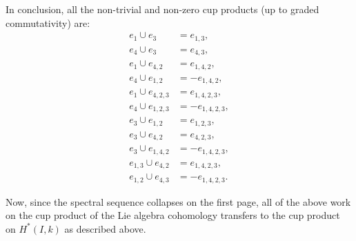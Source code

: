 In conclusion, all the non-trivial and non-zero cup products (up to graded commutativity) are:
\begin{equation}
  \label{eq:cup-products-GL2}
  \begin{aligned}
    e_{1} \cup e_{3} &= e_{1,3}, \\
    e_{4} \cup e_{3} &= e_{4,3}, \\
    e_{1} \cup e_{4,2} &= e_{1,4,2}, \\
    e_{4} \cup e_{1,2} &= -e_{1,4,2}, \\
    e_{1} \cup e_{4,2,3} &= e_{1,4,2,3}, \\
    e_{4} \cup e_{1,2,3} &= -e_{1,4,2,3}, \\
    e_{3} \cup e_{1,2} &= e_{1,2,3}, \\
    e_{3} \cup e_{4,2} &= e_{4,2,3}, \\
    e_{3} \cup e_{1,4,2} &= -e_{1,4,2,3}, \\
    e_{1,3} \cup e_{4,2} &= e_{1,4,2,3}, \\
    e_{1,2} \cup e_{4,3} &= -e_{1,4,2,3}.
  \end{aligned}
\end{equation}

Now, since the spectral sequence collapses on the first page, all of the above work on the cup product of the Lie algebra cohomology transfers to the cup product on $H^{*}(I,k)$ as described above.

